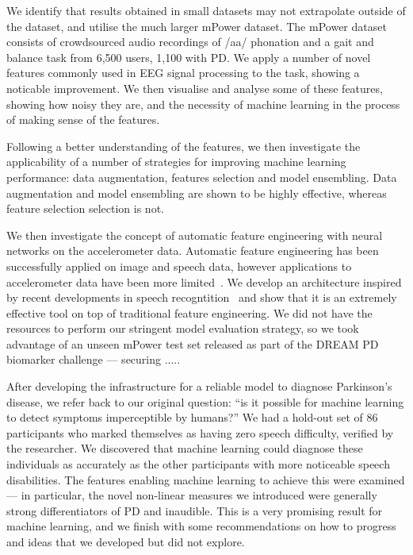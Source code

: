 \documentclass[12pt, twoside]{book}
\begin{document}
We identify that results obtained in small datasets may not extrapolate outside of the dataset, and utilise the much larger mPower dataset. The mPower dataset consists of crowdsourced audio recordings of /aa/ phonation and a gait and balance task from 6,500 users, 1,100 with PD. We apply a number of novel features commonly used in EEG signal processing to the task, showing a noticable improvement. We then visualise and analyse some of these features, showing how noisy they are, and the necessity of machine learning in the process of making sense of the features.

Following a better understanding of the features, we then investigate the applicability of a number of strategies for improving machine learning performance: data augmentation, features selection and model ensembling. Data augmentation and model ensembling are shown to be highly effective, whereas feature selection selection is not.%

We then investigate the concept of automatic feature engineering with neural networks on the accelerometer data. Automatic feature engineering has been successfully applied on image and speech data, however applications to accelerometer data have been more limited~\cite{deepconvlstm}. We develop an architecture inspired by recent developments in speech recogntition~\cite{wavenet} and show that it is an extremely effective tool on top of traditional feature engineering. We did not have the resources to perform our stringent model evaluation strategy, so we took advantage of an unseen mPower test set released as part of the DREAM PD biomarker challenge --- securing .....


After developing the infrastructure for a reliable model to diagnose Parkinson's disease, we refer back to our original question: ``is it possible for machine learning to detect symptoms imperceptible by humans?'' We had a hold-out set of 86 participants who marked themselves as having zero speech difficulty, verified by the researcher. We discovered that machine learning could diagnose these individuals as accurately as the other participants with more noticeable speech disabilities. The features enabling machine learning to achieve this were examined --- in particular, the novel non-linear measures we introduced were generally strong differentiators of PD and inaudible. This is a very promising result for machine learning, and we finish with some recommendations on how to progress and ideas that we developed but did not explore.
\end{document}

